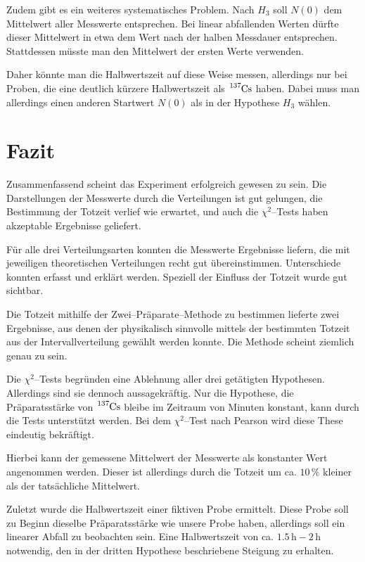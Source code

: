 \documentclass[12pt,a4paper]{scrartcl}
\numberwithin{equation}{section} %
\begin{document}
Zudem gibt es ein weiteres systematisches Problem. Nach $H_3$ soll $N(0)$ dem Mittelwert aller Messwerte entsprechen. Bei linear abfallenden Werten dürfte dieser Mittelwert in etwa dem Wert nach der halben Messdauer entsprechen. Stattdessen müsste man den Mittelwert der ersten Werte verwenden.

Daher könnte man die Halbwertszeit auf diese Weise messen, allerdings nur bei Proben, die eine deutlich kürzere Halbwertszeit als $\ce{^{137}Cs}$ haben. Dabei muss man allerdings einen anderen Startwert $N(0)$ als in der Hypothese $H_3$ wählen.

\clearpage
\hypertarget{fazit}{%
\section{Fazit}\label{fazit}}
Zusammenfassend scheint das Experiment erfolgreich gewesen zu sein. Die Darstellungen der Messwerte durch die Verteilungen ist gut gelungen, die Bestimmung der Totzeit verlief wie erwartet, und auch die $\chi^2$--Tests haben akzeptable Ergebnisse geliefert.

Für alle drei Verteilungsarten konnten die Messwerte Ergebnisse liefern, die mit jeweiligen theoretischen Verteilungen recht gut übereinstimmen. Unterschiede konnten erfasst und erklärt werden. Speziell der Einfluss der Totzeit wurde gut sichtbar.

Die Totzeit mithilfe der Zwei--Präparate--Methode zu bestimmen lieferte zwei Ergebnisse, aus denen der physikalisch sinnvolle mittels der bestimmten Totzeit aus der Intervallverteilung gewählt werden konnte. Die Methode scheint ziemlich genau zu sein.

Die $\chi^2$--Tests begründen eine Ablehnung aller drei getätigten Hypothesen. Allerdings sind sie dennoch aussagekräftig. Nur die Hypothese, die Präparatsstärke von $\ce{^{137}Cs}$ bleibe im Zeitraum von Minuten konstant, kann durch die Tests unterstützt werden. Bei dem $\chi^2$--Test nach Pearson wird diese These eindeutig bekräftigt.

Hierbei kann der gemessene Mittelwert der Messwerte als konstanter Wert angenommen werden. Dieser ist allerdings durch die Totzeit um ca. $10\,\%$ kleiner als der tatsächliche Mittelwert.

Zuletzt wurde die Halbwertszeit einer fiktiven Probe ermittelt. Diese Probe soll zu Beginn dieselbe Präparatsstärke wie unsere Probe haben, allerdings soll ein linearer Abfall zu beobachten sein. Eine Halbwertszeit von ca. $1.5\mathrm{\,h}-2\mathrm{\,h}$ notwendig, den in der dritten Hypothese beschriebene Steigung zu erhalten.
\end{document}
